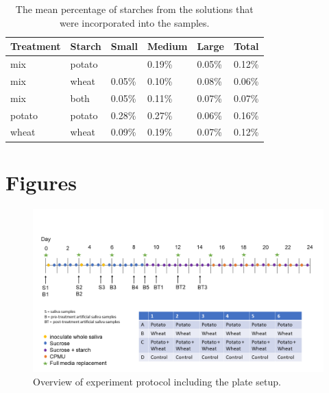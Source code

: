 \documentclass[utf8]{frontiers/frontiersSCNS}
\begin{document}
\begin{table}

\caption{\label{tab:sample-prop-tbl}The mean percentage of starches from the solutions that 
              were incorporated into the samples.}
\centering
\begin{tabular}[t]{l|l|l|l|l|l}
\hline
Treatment & Starch & Small & Medium & Large & Total\\
\hline
mix & potato &  & 0.19\% & 0.05\% & 0.12\%\\
\hline
mix & wheat & 0.05\% & 0.10\% & 0.08\% & 0.06\%\\
\hline
mix & both & 0.05\% & 0.11\% & 0.07\% & 0.07\%\\
\hline
potato & potato & 0.28\% & 0.27\% & 0.06\% & 0.16\%\\
\hline
wheat & wheat & 0.09\% & 0.19\% & 0.07\% & 0.12\%\\
\hline
\end{tabular}
\end{table}

\hypertarget{figures}{%
\section*{Figures}\label{figures}}

\begin{figure}[H]

{\centering \includegraphics[width=0.7\linewidth]{../figures/protocol_overview} 

}

\caption{Overview of experiment protocol including the plate setup.}\label{fig:protocol-fig}
\end{figure}
\end{document}
